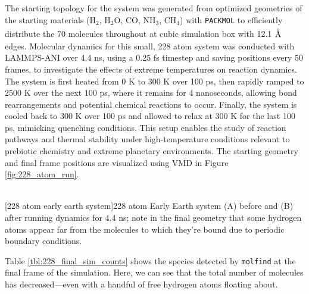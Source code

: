 The starting topology for the system was generated from optimized geometries of the starting materials
($\text{H}_2$, $\text{H}_2\text{O}$, CO, $\text{NH}_3$, $\text{CH}_4$)
with \verb|PACKMOL| \cite{packmol} to efficiently distribute the 70 molecules throughout at cubic simulation box with 12.1 $\angstrom$ edges.
Molecular dynamics for this small, 228 atom system was conducted with LAMMPS-ANI over 4.4 ns, using a 0.25 fs timestep and saving positions every 50 frames, to investigate the effects of extreme temperatures on reaction dynamics.
The system is first heated from 0 K to 300 K over 100 ps, then rapidly ramped to 2500 K over the next 100 ps, where it remains for 4 nanoseconds, allowing bond rearrangements and potential chemical reactions to occur. 
Finally, the system is cooled back to 300 K over 100 ps and allowed to relax at 300 K for the last 100 ps, mimicking quenching conditions.
This setup enables the study of reaction pathways and thermal stability under high-temperature conditions relevant to prebiotic chemistry and extreme planetary environments.
The starting geometry and final frame positions are visualized using VMD \cite{vmd} in Figure \ref{fig:228_atom_run}.  

\begin{flushleft}
\begin{multiFigure}
     \\
[228 atom early earth system]{228 atom Early Earth system (A) before and (B) after running dynamics for 4.4 ns; note in the final geometry that some hydrogen atoms appear far from the molecules to which they're bound due to periodic boundary conditions.
}
\label{fig:228_atom_run}
\end{multiFigure}
\end{flushleft}

Table \ref{tbl:228_final_sim_counts} shows the species detected by \verb|molfind| at the final frame of the simulation.
Here, we can see that the total number of molecules has decreased---even with a handful of free hydrogen atoms floating about. 


